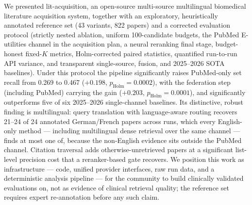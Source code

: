\documentclass[nonacm,sigconf]{acmart}
\begin{document}
We presented lit-acquisition, an open-source multi-source multilingual
biomedical literature acquisition system, together with an exploratory,
heuristically annotated reference set (43 variants, 822 papers) and a
corrected evaluation protocol (strictly nested ablation, uniform
100-candidate budgets, the PubMed E-utilities channel in the acquisition
plan, a neural reranking final stage, budget-honest fixed-$K$ metrics,
Holm-corrected paired statistics, quantified run-to-run API variance, and
transparent single-source, fusion, and 2025--2026 SOTA baselines). Under
this protocol the pipeline significantly raises PubMed-only set recall
from 0.269 to 0.467 ($+0.198$, $p_{\text{Holm}}{=}0.0002$), with the
federation step (including PubMed) carrying the gain
($+0.203$, $p_{\text{Holm}}{=}0.0001$), and significantly outperforms
five of six 2025--2026 single-channel baselines. Its distinctive,
robust finding is multilingual: query translation with language-aware
routing recovers 21--24 of 24 annotated German/French papers across runs,
which every English-only method --- including multilingual dense
retrieval over the same channel --- finds at most one of, because the
non-English evidence sits outside the PubMed channel. Citation traversal
adds otherwise-unretrieved papers at a significant list-level precision
cost that a reranker-based gate recovers. We position this work as
infrastructure --- code, unified provider interfaces, raw run data, and a
deterministic analysis pipeline --- for the community to build clinically
validated evaluations on, not as evidence of clinical retrieval quality;
the reference set requires expert re-annotation before any such claim.
\end{document}
